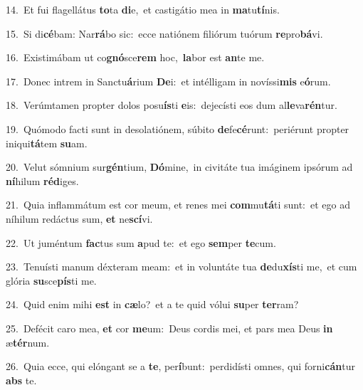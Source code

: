 {\numbfont\textcolor{\numbcolor}{14.}}~Et fui flagellátus \textbf{to}\-ta \textbf{di}\-e,~\star et castigátio mea in \textbf{ma}\-tu\-\textbf{tí}\-nis.\par
{\numbfont\textcolor{\numbcolor}{15.}}~Si di\-\textbf{cé}\-bam: Nar\-\textbf{rá}\-bo sic:~\star ecce natiónem filiórum tuórum \textbf{re}\-pro\-\textbf{bá}\-vi.\par
{\numbfont\textcolor{\numbcolor}{16.}}~Existimábam ut co\-\textbf{gnó}\-sce\textbf{rem} hoc,~\star \textbf{la}\-bor est \textbf{an}\-te me.\par
{\numbfont\textcolor{\numbcolor}{17.}}~Donec intrem in Sanctu\-\textbf{á}\-rium \textbf{De}\-i:~\star et intélligam in novíssi\textbf{mis} e\-\textbf{ó}\-rum.\par
{\numbfont\textcolor{\numbcolor}{18.}}~Verúmtamen propter dolos posu\-\textbf{ís}\-ti \textbf{e}\-is:~\star dejecísti eos dum al\-\textbf{le}\-va\-\textbf{rén}\-tur.\par
{\numbfont\textcolor{\numbcolor}{19.}}~Quómodo facti sunt in desolatiónem, súbito \textbf{de}\-fe\-\textbf{cé}\-runt:~\star periérunt propter iniqui\-\textbf{tá}\-tem \textbf{su}\-am.\par
{\numbfont\textcolor{\numbcolor}{20.}}~Velut sómnium sur\-\textbf{gén}\-tium, \textbf{Dó}\-mine,~\star in civitáte tua imáginem ipsórum ad \textbf{ní}\-hilum \textbf{réd}\-iges.\par
{\numbfont\textcolor{\numbcolor}{21.}}~Quia inflammátum est cor meum, et renes mei \textbf{com}\-mu\-\textbf{tá}\-ti sunt:~\star et ego ad níhilum redáctus sum, \textbf{et} ne\-\textbf{scí}\-vi.\par
{\numbfont\textcolor{\numbcolor}{22.}}~Ut juméntum \textbf{fac}\-tus sum \textbf{a}\-pud te:~\star et ego \textbf{sem}\-per \textbf{te}\-cum.\par
{\numbfont\textcolor{\numbcolor}{23.}}~Tenuísti manum déxteram meam:~\dagger et in voluntáte tua \textbf{de}\-du\-\textbf{xís}\-ti me,~\star et cum glória \textbf{su}\-sce\-\textbf{pís}\-ti me.\par
{\numbfont\textcolor{\numbcolor}{24.}}~Quid enim mihi \textbf{est} in \textbf{cæ}\-lo?~\star et a te quid vólui \textbf{su}\-per \textbf{ter}\-ram?\par
{\numbfont\textcolor{\numbcolor}{25.}}~Defécit caro mea, \textbf{et} cor \textbf{me}\-um:~\star Deus cordis mei, et pars mea Deus \textbf{in} æ\-\textbf{tér}\-num.\par
{\numbfont\textcolor{\numbcolor}{26.}}~Quia ecce, qui elóngant se a \textbf{te}\-, per\-\textbf{í}\-bunt:~\star perdidísti omnes, qui forni\-\textbf{cán}\-tur \textbf{abs} te.\par
